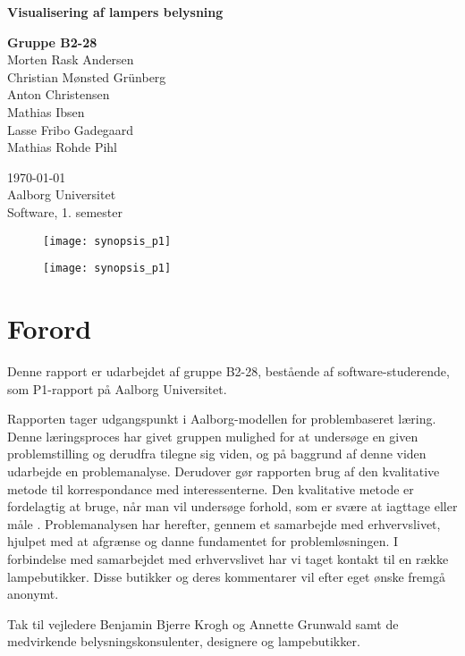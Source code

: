 \begin{titlepage}
  \vspace{0.2cm}
  \begin{center}
    \Huge{\textbf{Visualisering af lampers belysning}}
  \end{center}
  \vspace{0.2cm}
  \begin{center}
    \Large{\textbf{Gruppe B2-28}}\\
	Morten Rask Andersen\\
	Christian Mønsted Grünberg\\
	Anton Christensen\\
	Mathias Ibsen\\
	Lasse Fribo Gadegaard\\
	Mathias Rohde Pihl
  \end{center}
  \vfill
  \begin{center}
 	\today\\
    Aalborg Universitet\\
    Software, 1. semester
  \end{center}
  \begin{figure}[H]
      \texttt{[image: synopsis\_p1]}
  \end{figure}
\end{titlepage}


\begin{figure}[H]
    \texttt{[image: synopsis\_p1]}
\end{figure}
\clearpage



\clearpage


\section{Forord}
Denne rapport er udarbejdet af gruppe B2-28, bestående af software-studerende, som P1-rapport på Aalborg Universitet.

Rapporten tager udgangspunkt i Aalborg-modellen for problembaseret læring. Denne læringsproces har givet gruppen mulighed for at undersøge en given problemstilling og derudfra tilegne sig viden, og på baggrund af denne viden udarbejde en problemanalyse. Derudover gør rapporten brug af den kvalitative metode til korrespondance med interessenterne. Den kvalitative metode er fordelagtig at bruge, når man vil undersøge forhold, som er svære at iagttage eller måle \cite{kvalitativ_metode}. Problemanalysen har herefter, gennem et samarbejde med erhvervslivet, hjulpet med at afgrænse og danne fundamentet for problemløsningen. I forbindelse med samarbejdet med erhvervslivet har vi taget kontakt til en række lampebutikker. Disse butikker og deres kommentarer vil efter eget ønske fremgå anonymt. 

Tak til vejledere Benjamin Bjerre Krogh og Annette Grunwald samt de medvirkende belysningskonsulenter, designere og lampebutikker.
\clearpage

\clearpage